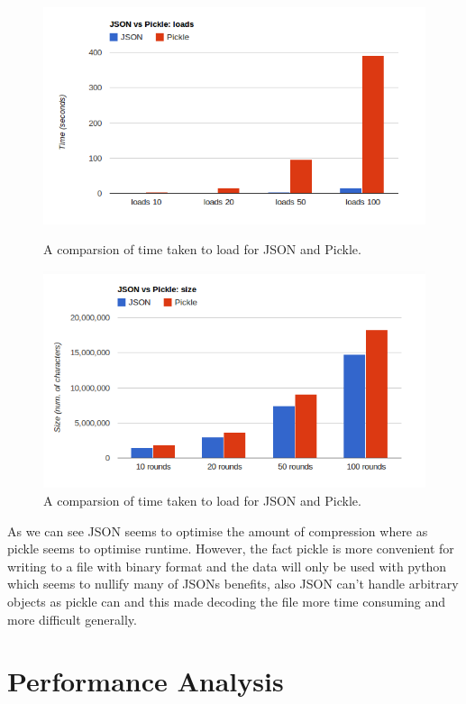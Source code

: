 \documentclass{mm2}
\begin{document}
\begin{figure}[ht]
  \includegraphics[width=\linewidth]{figures/picklejson1.png}
  \caption{A comparsion of time taken to load for JSON and Pickle.}\label{fig:picklejson1}
\endminipage\hfill
{}%
  \includegraphics[width=\linewidth]{figures/picklejson2.png}
  \caption{A comparsion of time taken to load for JSON and Pickle.}\label{fig:picklejson2}
\endminipage
\end{figure}
As we can see JSON seems to optimise the amount of compression where as pickle seems to optimise runtime. However, the fact pickle is more convenient for writing to a file with binary format and the data will only be used with python which seems to nullify many of JSONs benefits, also JSON can't handle arbitrary objects as pickle can and this made decoding the file more time consuming and more difficult generally.
\section{Performance Analysis}
\end{document}
